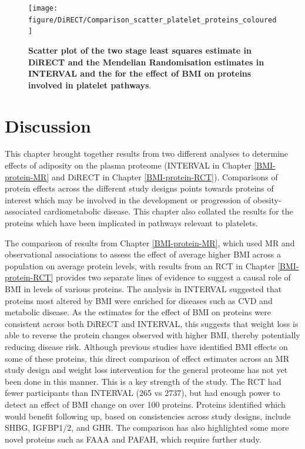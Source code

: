\documentclass[11pt,twoside]{bristolthesis}
\begin{document}
\begin{figure}

{\centering \texttt{[image: figure/DiRECT/Comparison\_scatter\_platelet\_proteins\_coloured]} 

}

\caption[Scatter plot of the two stage least squares estimate in DiRECT and the Mendelian Randomisation estimates in INTERVAL and the for the effect of BMI on proteins involved in platelet pathways]{\textbf{Scatter plot of the two stage least squares estimate in DiRECT and the Mendelian Randomisation estimates in INTERVAL and the for the effect of BMI on proteins involved in platelet pathways}.}\label{fig:DiRECT-INTERVAL-platelet}
\end{figure}
\hypertarget{discussion-5}{%
\section{Discussion}\label{discussion-5}}

This chapter brought together results from two different analyses to determine effects of adiposity on the plasma proteome (INTERVAL in Chapter \ref{BMI-protein-MR} and DiRECT in Chapter \ref{BMI-protein-RCT}). Comparisons of protein effects across the different study designs points towards proteins of interest which may be involved in the development or progression of obesity-associated cardiometabolic disease. This chapter also collated the results for the proteins which have been implicated in pathways relevant to platelets.

The comparison of results from Chapter \ref{BMI-protein-MR}, which used MR and observational associations to assess the effect of average higher BMI across a population on average protein levels, with results from an RCT in Chapter \ref{BMI-protein-RCT} provides two separate lines of evidence to suggest a causal role of BMI in levels of various proteins. The analysis in INTERVAL suggested that proteins most altered by BMI were enriched for diseases such as CVD and metabolic disease. As the estimates for the effect of BMI on proteins were consistent across both DiRECT and INTERVAL, this suggests that weight loss is able to reverse the protein changes observed with higher BMI, thereby potentially reducing disease risk. Although previous studies have identified BMI effects on some of these proteins, this direct comparison of effect estimates across an MR study design and weight loss intervention for the general proteome has not yet been done in this manner. This is a key strength of the study. The RCT had fewer participants than INTERVAL (265 vs 2737), but had enough power to detect an effect of BMI change on over 100 proteins. Proteins identified which would benefit following up, based on consistencies across study designs, include SHBG, IGFBP1/2, and GHR. The comparison has also highlighted some more novel proteins such as FAAA and PAFAH, which require further study.
\end{document}
